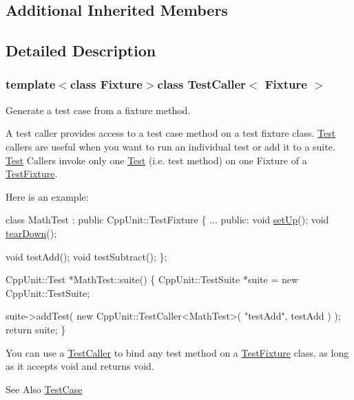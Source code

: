 \subsection*{Additional Inherited Members}


\subsection{Detailed Description}
\subsubsection*{template$<$class Fixture$>$class Test\-Caller$<$ Fixture $>$}

Generate a test case from a fixture method.

A test caller provides access to a test case method on a test fixture class. \hyperlink{class_test}{Test} callers are useful when you want to run an individual test or add it to a suite. \hyperlink{class_test}{Test} Callers invoke only one \hyperlink{class_test}{Test} (i.\-e. test method) on one Fixture of a \hyperlink{class_test_fixture}{Test\-Fixture}. 

Here is an example\-: 
\begin{DoxyCode}
\textcolor{keyword}{class }MathTest : \textcolor{keyword}{public} CppUnit::TestFixture \{
        ...
    \textcolor{keyword}{public}:
        \textcolor{keywordtype}{void}         \hyperlink{class_test_caller_ae6880afc711d24ae0b8846759064ceea}{setUp}();
        \textcolor{keywordtype}{void}         \hyperlink{class_test_caller_a0e463b88bf0ceacbd8875e0450ed2649}{tearDown}();

        \textcolor{keywordtype}{void}         testAdd();
        \textcolor{keywordtype}{void}         testSubtract();
\};

CppUnit::Test *MathTest::suite() \{
    CppUnit::TestSuite *suite = \textcolor{keyword}{new} CppUnit::TestSuite;

    suite->addTest( \textcolor{keyword}{new} CppUnit::TestCaller<MathTest>( \textcolor{stringliteral}{"testAdd"}, testAdd ) );
    \textcolor{keywordflow}{return} suite;
\}
\end{DoxyCode}


You can use a \hyperlink{class_test_caller}{Test\-Caller} to bind any test method on a \hyperlink{class_test_fixture}{Test\-Fixture} class, as long as it accepts void and returns void.

\begin{DoxySeeAlso}{See Also}
\hyperlink{class_test_case}{Test\-Case} 
\end{DoxySeeAlso}


